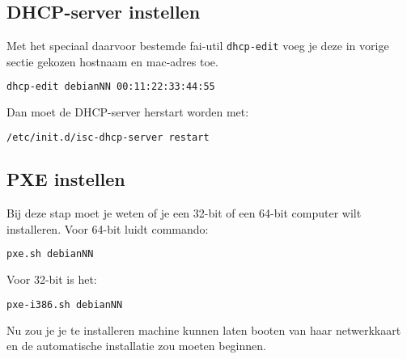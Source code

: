 \subsection{DHCP-server instellen}
Met het speciaal daarvoor bestemde fai-util \texttt{dhcp-edit} voeg je deze in vorige sectie gekozen hostnaam en mac-adres toe.
\begin{lstlisting}[language=bash]
dhcp-edit debianNN 00:11:22:33:44:55
\end{lstlisting}
Dan moet de DHCP-server herstart worden met:

\begin{lstlisting}[language=bash]
/etc/init.d/isc-dhcp-server restart
\end{lstlisting}


\subsection{PXE instellen}
Bij deze stap moet je weten of je een 32-bit of een 64-bit computer wilt installeren.
Voor 64-bit luidt commando:
\begin{lstlisting}[language=bash]
pxe.sh debianNN
\end{lstlisting}
Voor 32-bit is het:
\begin{lstlisting}[language=bash]
pxe-i386.sh debianNN
\end{lstlisting}

Nu zou je je te installeren machine kunnen laten booten van haar netwerkkaart en de automatische installatie zou moeten beginnen.

